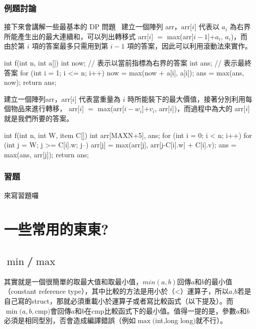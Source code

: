 \documentclass[main.tex]{subfiles}
\begin{document}
\subsection{例題討論} 
接下來會講解一些最基本的 DP 問題~
建立一個陣列 arr，arr[$i$] 代表以 $a_i$ 為右界所能產生出的最大連續和，可以列出轉移式 arr[$i$] $=$ max(arr[$i-1$]$+ a_i$, $a_i$)，而由於第 $i$ 項的答案最多只需用到第 $i-1$ 項的答案，因此可以利用滾動法來實作。
\begin{C++}
	int f(int n, int a[]) {
		int now; // 表示以當前指標為右界的答案
		int ans; // 表示最終答案
		for (int i = 1; i <= n; i++) {
			now = max(now + a[i], a[i]);
			ans = max(ans, now);
		}
		return ans;
	}
\end{C++}

建立一個陣列arr，arr[$i$] 代表當重量為 $i$ 時所能裝下的最大價值，接著分別利用每個物品來進行轉移，  arr[$i$] $=$ max(arr[$i-w_i$]$+ v_i$, arr[$i$])，而過程中為大的 arr[$i$] 就是我們所要的答案。
\begin{C++}
	int f(int n, int W, item C[]) {
		int arr[MAXN+5], ans;
		for (int i = 0; i < n; i++) {
			for (int j = W; j >= C[i].w; j--) {
				arr[j] = max(arr[j], arr[j-C[i].w] + C[i].v);
				ans = max(ans, arr[j]);
			}
		}
		return ans;
	}
\end{C++}
\subsection{習題} 
來寫習題囉

\chapter{一些常用的東東?}
\section{$\min$/$\max$}
其實就是一個很簡單的取最大值和取最小值，$min(a,b)$回傳$a$和$b$的最小值（constant reference type），其中比較的方法是用小於（<）運算子，所以$a$,$b$若是自己寫的struct，那就必須重載小於運算子或者寫比較函式（以下提及）。而$\min(a,b,$cmp$)$會回傳$a$和$b$在cmp比較函式下的最小值。值得一提的是，參數$a$和$b$必須是相同型別，否會造成編譯錯誤（例如$\max($int,long long$)$就不行）。
\end{document}
